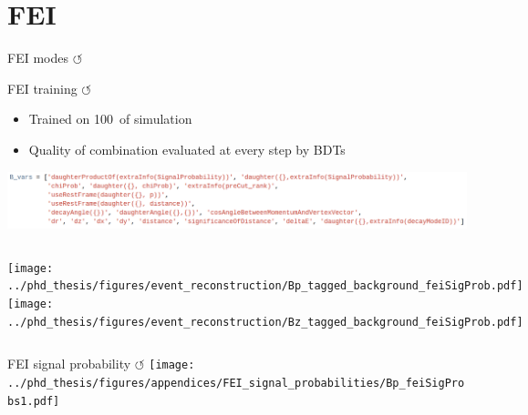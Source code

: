 \documentclass[xcolor=dvipsnames]{beamer}
\begin{document}
\section{FEI}


\begin{frame}{FEI modes \hyperlink{frame:A}{$\circlearrowleft$}}
   \centering
   \resizebox{0.45\textheight}{!}{
      
   }
\end{frame}

\begin{frame}{FEI training \hyperlink{frame:A}{$\circlearrowleft$}}
   \scriptsize\centering
   \begin{itemize}
      \item Trained on 100~\invfb of simulation
      \item Quality of combination evaluated at every step by BDTs
   \end{itemize}
   \includegraphics[width=1\textwidth]{figures/fei_b_vars.png}

   \begin{columns}
      \texttt{[image: ../phd\_thesis/figures/event\_reconstruction/Bp\_tagged\_background\_feiSigProb.pdf]}
      \texttt{[image: ../phd\_thesis/figures/event\_reconstruction/Bz\_tagged\_background\_feiSigProb.pdf]}
   \end{columns}
  
\end{frame}

\begin{frame}{FEI signal probability \feiProb \hyperlink{frame:A}{$\circlearrowleft$}}
\centering
      \texttt{[image: ../phd\_thesis/figures/appendices/FEI\_signal\_probabilities/Bp\_feiSigProbs1.pdf]}

\end{frame}
\end{document}

